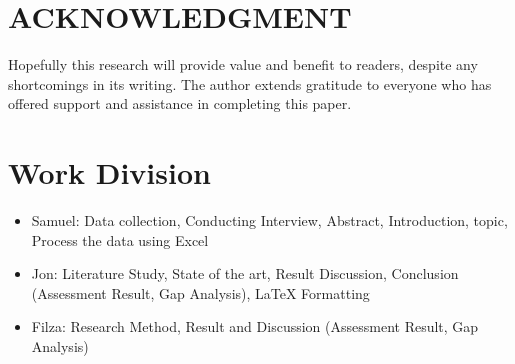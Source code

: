 \documentclass[conference]{IEEEtran}
\begin{document}
\section*{ACKNOWLEDGMENT}


Hopefully this research will provide value and benefit to readers, despite any shortcomings in its writing. The author extends gratitude to everyone who has offered support and assistance in completing this paper.

\section*{Work Division}
\begin{itemize}
    \item Samuel: Data collection, Conducting Interview, Abstract, Introduction, topic, Process the data using Excel
    \item Jon: Literature Study, State of the art, Result Discussion, Conclusion (Assessment Result, Gap Analysis), \LaTeX{} Formatting
    \item Filza: Research Method, Result and Discussion (Assessment Result, Gap Analysis)
\end{itemize}







\end{document}
